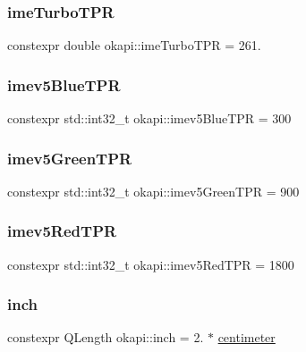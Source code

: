 \subsubsection{\texorpdfstring{imeTurboTPR}{imeTurboTPR}}
{\footnotesize\ttfamily constexpr double okapi\+::ime\+Turbo\+T\+PR = 261.\hspace{0.3cm}{\ttfamily [static]}}

\mbox{\label{namespaceokapi_a8d9e012d255d1fc2154c0dd9345d61ae}} 
\subsubsection{\texorpdfstring{imev5BlueTPR}{imev5BlueTPR}}
{\footnotesize\ttfamily constexpr std\+::int32\+\_\+t okapi\+::imev5\+Blue\+T\+PR = 300\hspace{0.3cm}{\ttfamily [static]}}

\mbox{\label{namespaceokapi_a5263bab3bfecd482a573b6d04fb584ac}} 
\subsubsection{\texorpdfstring{imev5GreenTPR}{imev5GreenTPR}}
{\footnotesize\ttfamily constexpr std\+::int32\+\_\+t okapi\+::imev5\+Green\+T\+PR = 900\hspace{0.3cm}{\ttfamily [static]}}

\mbox{\label{namespaceokapi_a3c1877d878fa2a5f78f1d6edaebb6a7c}} 
\subsubsection{\texorpdfstring{imev5RedTPR}{imev5RedTPR}}
{\footnotesize\ttfamily constexpr std\+::int32\+\_\+t okapi\+::imev5\+Red\+T\+PR = 1800\hspace{0.3cm}{\ttfamily [static]}}

\mbox{\label{namespaceokapi_a7da6f1f2fa46ec3694ba3f5361bcba80}} 
\subsubsection{\texorpdfstring{inch}{inch}}
{\footnotesize\ttfamily constexpr Q\+Length okapi\+::inch = 2. $\ast$ \mbox{\hyperlink{namespaceokapi_a889129a4ecb3e93c695c8eea53b96602}{centimeter}}}

